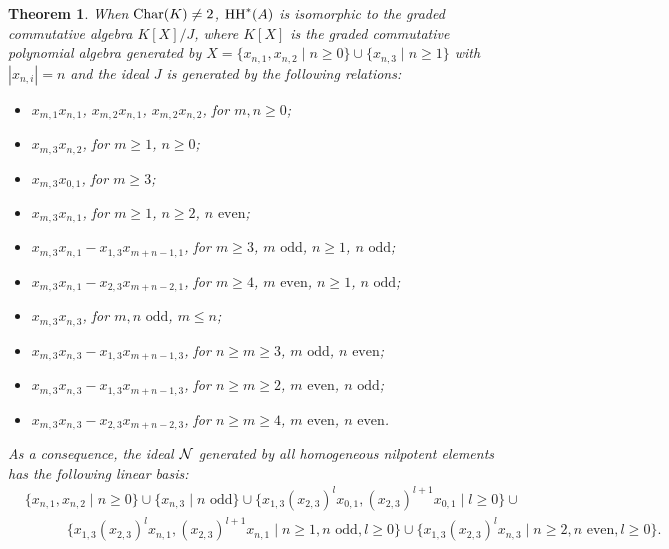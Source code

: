 \documentclass[10pt, reqno]{amsart}
\newtheorem{theorem}{Theorem}[section]
\theoremstyle{definition}
\theoremstyle{remark}
\numberwithin{equation}{section}
\begin{document}
\begin{theorem}\label{thm: char neq 2 ring}
     When $\mathrm{Char}(K) \neq 2$, $\mathrm{HH}^*(A)$ is isomorphic to the    graded commutative algebra \(K [X]/J\), where \(  K [X]\) is the  graded commutative polynomial algebra  generated by \(X =\{x_{n,1}, x_{n,2}\mid
     n \ge 0\}\cup \{x_{n,3}\mid n \ge 1\}\) with \(|x_{n,i}| = n\) and the ideal \(J\) is generated by the following relations:
\begin{itemize}
     \item \(x_{m,1} x_{n,1}\), \(x_{m,2} x_{n,1}\), \(x_{m,2} x_{n,2}\),  for \(m,n \ge 0\);

    \item \(x_{m,3} x_{n,2} \),  for $m \ge 1$, $n \ge 0$;
    \item  \(x_{m,3} x_{0,1} \),  for \(m \ge 3\);
    \item  \(x_{m,3} x_{n,1} \),  for \(m\ge 1\), \(n \ge 2\), \(n \text{ even}\);
    \item  \(x_{m,3} x_{n,1} -x_{1,3} x_{m+n-1,1} \),  for \(m\ge 3\), \(m \text{ odd}\),  \(n \ge 1\), \(n \text{ odd}\);
    \item \(x_{m,3} x_{n,1} -x_{2,3} x_{m+n-2,1} \),  for \(m\ge 4\), \(m \text{ even}\),  \(n \ge 1\), \(n \text{ odd}\);
    \item \(x_{m,3} x_{n,3} \),  for \(m,n \text{ odd}\), \(m\le n\);

    \item  \(x_{m,3} x_{n,3} - x_{1,3} x_{m+n-1,3} \),  for \(n\ge m \ge 3\), \(m \text{ odd}\), \(n \text{ even}\);
     \item \(x_{m,3} x_{n,3} - x_{1,3} x_{m+n-1,3}\), for \(n\ge m\ge 2\), \(m \text{ even}\), \(n \text{ odd}\);
    \item \(x_{m,3} x_{n,3} - x_{2,3} x_{m+n-2,3} \),  for \(n\ge m \ge 4\), \(m \text{ even}\), \(n \text{ even}\).
   
\end{itemize}

As a consequence, the   ideal   $\mathcal{N}$ generated by all homogeneous nilpotent elements has the following linear basis: 
$$\begin{aligned}
    &\{x_{n,1}, x_{n,2}\mid n\ge 0\} \cup \{x_{n,3}\mid n \text{ odd}\}\cup\{x_{1,3}(x_{2,3})^lx_{0,1}, (x_{2,3})^{l+1}x_{0,1}\mid l\ge 0\}\cup \\
&\quad\quad\quad\{x_{1,3}(x_{2,3})^l x_{n,1},  (x_{2,3})^{l+1} x_{n,1} \mid n \ge 1, n\text{ odd}, l \ge 0\} \cup \{x_{1,3}(x_{2,3})^l x_{n,3} \mid n \ge 2, n\text{ even}, l \ge 0\}.
\end{aligned}$$
 
\end{theorem}
\end{document}
